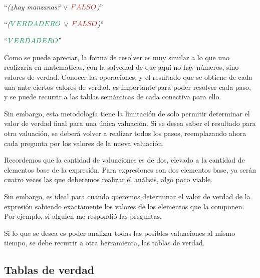 \begin{example}
    \dindent ``\textit{(¿hay manzanas? $\lor$ $\lfalsefull$)}''

    \dindent {}

    \dindent ``\textit{($\ltruefull$ $\lor$ $\lfalsefull$)}''

    \dindent {}

    \dindent {}

    \dindent ``\textit{$\ltruefull$}''
\end{example}

Como se puede apreciar, la forma de resolver es muy similar a lo que uno
realizaría en matemáticas, con la salvedad de que aquí no hay números, sino
valores de verdad. Conocer las operaciones, y el resultado que se obtiene de
cada una ante ciertos valores de verdad, es importante para poder resolver cada
paso, y se puede recurrir a las tablas semánticas de cada conectiva para ello.

Sin embargo, esta metodología tiene la limitación de solo permitir determinar el
valor de verdad final para una única valuación. Si se desea saber el resultado
para otra valuación, se deberá volver a realizar todos los pasos, reemplazando
ahora cada pregunta por los valores de la nueva valuación.

Recordemos que la cantidad de valuaciones es de dos, elevado a la cantidad de
elementos base de la expresión. Para expresiones con dos elementos base, ya
serán cuatro veces las que deberemos realizar el análisis, algo poco viable.

Sin embargo, es ideal para cuando queremos determinar el valor de verdad de la
expresión sabiendo exactamente los valores de los elementos que la componen. Por
ejemplo, si alguien me respondió las preguntas.

Si lo que se desea es poder analizar todas las posibles valuaciones al mismo
tiempo, se debe recurrir a otra herramienta, las tablas de verdad.

\subsection{Tablas de verdad}
\label{chap:logica:subsec:tablas_de_verdad}

